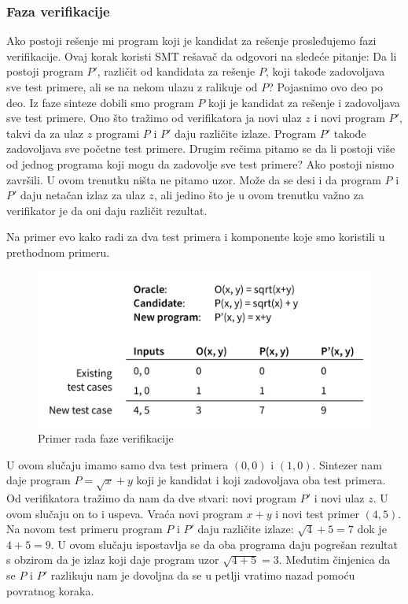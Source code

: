 \subsubsection*{Faza verifikacije}

Ako postoji rešenje mi program koji je kandidat za rešenje prosleđujemo fazi verifikacije. Ovaj korak koristi SMT rešavač da odgovori na sledeće pitanje: Da li postoji program $P'$, različit od kandidata za rešenje $P$, koji takođe zadovoljava sve test primere, ali se na nekom ulazu z ralikuje od $P$?
Pojasnimo ovo deo po deo. Iz faze sinteze dobili smo program $P$ koji je kandidat za rešenje i zadovoljava sve test primere. Ono što tražimo od verifikatora ja novi ulaz $z$ i novi program $P'$, takvi da za ulaz $z$ programi $P$ i $P'$ daju različite izlaze. Program $P'$ takođe zadovoljava sve početne test primere.
Drugim rečima pitamo se da li postoji više od jednog programa koji mogu da zadovolje sve test primere? Ako postoji nismo završili.
U ovom trenutku ništa ne pitamo uzor. Može da se desi i da program $P$ i $P'$ daju netačan izlaz za ulaz $z$, ali jedino što je u ovom trenutku važno za verifikator je da oni daju različit rezultat.

Na primer evo kako radi za dva test primera i komponente koje smo koristili u prethodnom primeru.

\begin{figure}[h!]
    \begin{center}
        \includegraphics[scale=0.6]{resources/oracle-table.png}
    \end{center}
    \caption{Primer rada faze verifikacije}
    \label{fig:oraclePrimer1}
\end{figure}

U ovom slučaju imamo samo dva test primera $(0,0)$ i $(1,0)$. Sintezer nam daje program $P=\sqrt{x}+y$ koji je kandidat i koji zadovoljava oba test primera. Od verifikatora tražimo da nam da dve stvari: novi program $P'$ i novi ulaz $z$. U ovom slučaju on to i uspeva. Vraća novi program $x+y$ i novi test primer $(4,5)$. Na novom test primeru program $P$ i $P'$ daju različite izlaze: $\sqrt{4}+5=7$ dok je $4+5=9$. U ovom slučaju ispostavlja se da oba programa daju pogrešan rezultat s obzirom da je izlaz koji daje program uzor $\sqrt{4+5}=3$. Međutim činjenica da se $P$ i $P'$ razlikuju nam je dovoljna da se u petlji vratimo nazad pomoću povratnog koraka.


